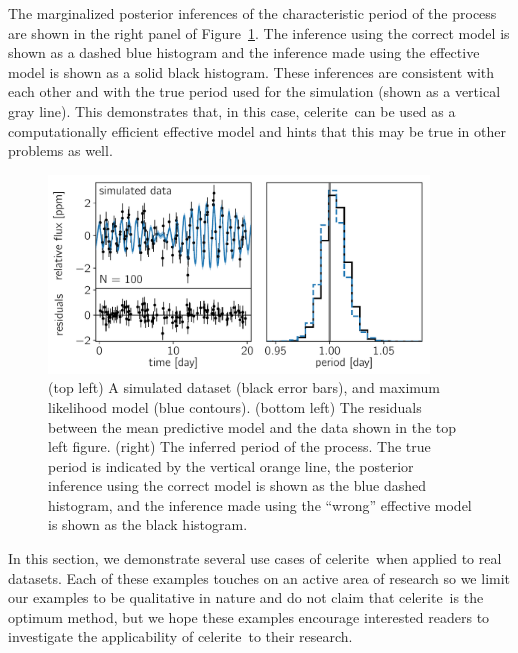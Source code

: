 \documentclass[manuscript, letterpaper]{aastex6}
\makeatletter
\let\origsection\section
\renewcommand\section{\@ifstar{\starsection}{\nostarsection}}
\newcommand\nostarsection[1]{\sectionprelude\origsection{#1}}
\newcommand\starsection[1]{\sectionprelude\origsection*{#1}}
\newcommand\sectionprelude{\vspace{1em}}
\newcommand{\project}[1]{\textsf{#1}}
\newcommand{\celerite}{\project{celerite}}
\newcommand{\figureref}[1]{\ref{fig:#1}}
\newcommand{\Figure}[1]{Figure~\figureref{#1}}
\newcommand{\figurelabel}[1]{\label{fig:#1}}
\newcommand{\sectlabel}[1]{\label{sect:#1}}
\makeatother
\begin{document}
{The marginalized posterior inferences of the characteristic period of the
process are shown in the right panel of \Figure{simulated-wrong}.
The inference using the correct model is shown as a dashed blue histogram and
the inference made using the effective model is shown as a solid black
histogram.
These inferences are consistent with each other and with the true period used
for the simulation (shown as a vertical gray line).
This demonstrates that, in this case, \celerite\ can be used as a
computationally efficient effective model and hints that this may be true in
other problems as well.
}



\begin{figure}[!htbp]
\begin{center}
\includegraphics[width=0.9\textwidth]{figures/simulated/wrong-qpo.pdf}
\caption{(top left) A simulated dataset (black error bars), and maximum
    likelihood model (blue contours).
    (bottom left) The residuals between the mean predictive model and the data
    shown in the top left figure.
    (right) The inferred period of the process. The true period is indicated
    by the vertical orange line, the posterior inference using the correct
    model is shown as the blue dashed histogram, and the inference made using
    the ``wrong'' effective model is shown as the black histogram.
    \figurelabel{simulated-wrong}}
\end{center}
\end{figure}


\section{Examples with real data} \sectlabel{examples-real}

In this section, we demonstrate several use cases of \celerite\ when
applied to real datasets.
Each of these examples touches on an active area of research so we limit our
examples to be qualitative in nature and do not claim that \celerite\ is the
optimum method, but we hope these examples encourage interested readers to
investigate the applicability of \celerite\ to their research.
\end{document}

